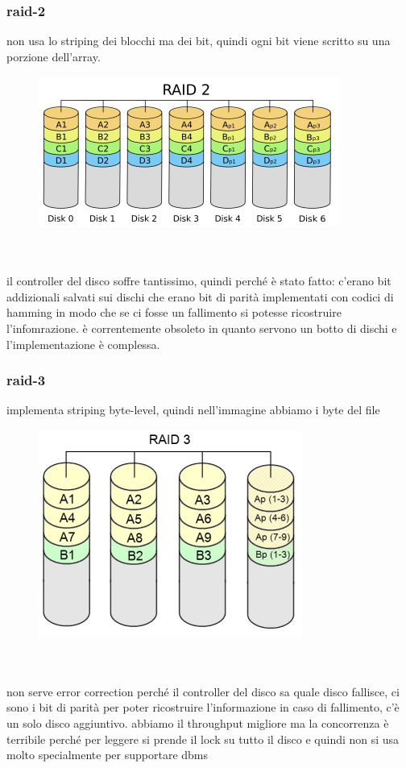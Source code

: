 \documentclass[12pt, oneside]{extbook} %
\begin{document}
\subsubsection{raid-2}
non usa lo striping dei blocchi ma dei bit, quindi ogni bit viene scritto su una porzione dell'array.\\
\begin{figure}[!h]
	\includegraphics[scale=0.4]{immagini/raid2.png}
\end{figure}\\\\
il controller del disco soffre tantissimo, quindi perché è stato fatto: c'erano bit addizionali salvati sui dischi che erano bit di parità implementati con codici di hamming in modo che se ci fosse un fallimento si potesse ricostruire l'infomrazione. è correntemente obsoleto in quanto servono un botto di dischi e l'implementazione è complessa.
\subsubsection{raid-3}
implementa striping byte-level, quindi nell'immagine abbiamo i byte del file\\
\begin{figure}[!h]
	\includegraphics[scale=0.4]{immagini/raid3.png}
\end{figure}\\\\
non serve error correction perché il controller del disco sa quale disco fallisce, ci sono i bit di parità per poter ricostruire l'informazione in caso di fallimento, c'è un solo disco aggiuntivo. abbiamo il throughput migliore ma la concorrenza è terribile perché per leggere si prende il lock su tutto il disco e quindi non si usa molto specialmente per supportare dbms
\end{document}
